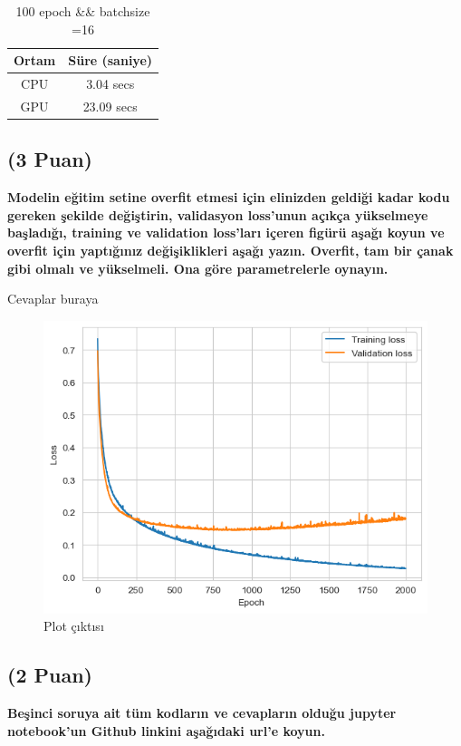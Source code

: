 \documentclass[11pt]{article}
\begin{document}
\begin{table}[ht!]
    \centering
    \caption{100 epoch && batchsize =16}
    \begin{tabular}{c|c}
        Ortam & Süre (saniye) \\\hline
        CPU & 3.04 secs\\
        GPU & 23.09 secs\\
    \end{tabular}
    \label{tab:my_table}
\end{table}

\subsection{(3 Puan)} \textbf{Modelin eğitim setine overfit etmesi için elinizden geldiği kadar kodu gereken şekilde değiştirin, validasyon loss'unun açıkça yükselmeye başladığı, training ve validation loss'ları içeren figürü aşağı koyun ve overfit için yaptığınız değişiklikleri aşağı yazın. Overfit, tam bir çanak gibi olmalı ve yükselmeli. Ona göre parametrelerle oynayın.}

Cevaplar buraya

\begin{figure}[ht!]
    \centering
    \includegraphics{plot.png}
    \caption{Plot çıktısı}
    \label{fig:my_pic}
\end{figure}

\subsection{(2 Puan)} \textbf{Beşinci soruya ait tüm kodların ve cevapların olduğu jupyter notebook'un Github linkini aşağıdaki url'e koyun.}
\end{document}
